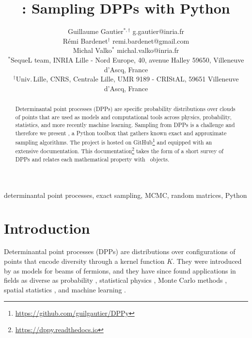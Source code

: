 \documentclass[twoside,11pt]{article}
\begin{document}
\title{\DPPy: Sampling DPPs with Python}

\author{\name Guillaume Gautier$^{*,\dagger}$ \email g.gautier@inria.fr \\
       \name R\'emi Bardenet$^\dagger$ \email remi.bardenet@gmail.com \\
       \name Michal Valko$^*$ \email michal.valko@inria.fr\\
       \addr $^*$SequeL team, INRIA Lille - Nord Europe,  40, avenue Halley 59650, Villeneuve d'Ascq, France\\
       \addr $^\dagger$Univ.\,Lille, CNRS, Centrale Lille, UMR 9189 - CRIStAL, 59651 Villeneuve d'Ascq, France
}

\editor{}

\maketitle

\setcounter{footnote}{3}
\begin{abstract}%
  Determinantal point processes (DPPs) are specific probability distributions over clouds of points that are used as models and computational tools across physics, probability, statistics, and more recently machine learning.
  Sampling from DPPs is a challenge and therefore we present \DPPy, a Python toolbox that gathers known exact and approximate sampling algorithms.
  The project is hosted on GitHub\footnote{\label{fn:github}\url{https://github.com/guilgautier/DPPy}} and equipped with an extensive documentation.
  This documentation\footnote{\label{fn:docs}\url{https://dppy.readthedocs.io}} takes the form of a short survey of DPPs and relates each mathematical property with \DPPy\ objects.
\end{abstract}

\begin{keywords}%
    determinantal point processes,
    exact sampling,
    MCMC,
    random matrices,
    Python
\end{keywords}

\section{Introduction} %
\label{sec:introduction}

    Determinantal point processes (DPPs) are distributions over configurations of points that encode diversity through a kernel function $K$.
    They were introduced by \citet{Mac75} as models for beams of fermions, and they have since found applications in fields as diverse as probability \citep{Sos00, Kon05, HKPV06}, statistical physics \citep{PaBe11}, Monte Carlo methods \citep{BaHa16}, spatial statistics \citep{LaMoRu15}, and machine learning \citep[ML,][]{KuTa12}.
\end{document}
